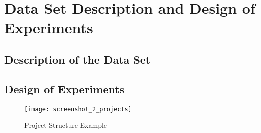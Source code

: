 \chapter{Data Set Description and Design of Experiments\label{cha:chapter4}}

\section{Description of the Data Set\label{sec:xx}}

\section{Design of Experiments\label{sec:yy}}

\begin{figure}[htb]
  \centering
  \texttt{[image: screenshot\_2\_projects]}
  \caption{Project Structure Example}
  \label{fig:projects}
\end{figure}

